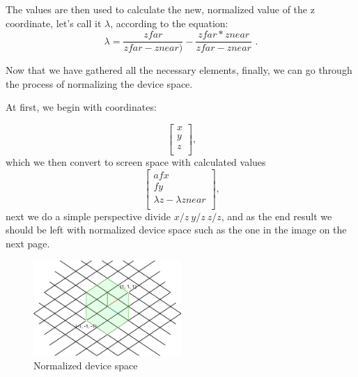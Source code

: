 The values are then used to calculate the new, normalized value of the z coordinate, let's call it $\lambda$, according to the equation:
\begin{equation}
\lambda=\frac{zfar}{zfar - znear)}
-
\frac{zfar * znear}{zfar-znear}
\text{ .}
\label{zequation}
\end{equation} 

Now that we have gathered all the necessary elements, finally, we can go through the process of normalizing the device space.

At first, we begin with coordinates:

\begin{equation}
\begin{bmatrix}
x\\
y\\
z\\
\end{bmatrix}
\text{,}
\label{xyzequation}
\end{equation} 
which we then convert to screen space with calculated values 
\begin{equation}
\begin{bmatrix}
afx\\
fy\\
\lambda z-\lambda znear\\
\end{bmatrix}
\text{,}
\label{zfullxyzequation}
\end{equation} 
next we do a simple perspective divide $x/z\ y/z\ z/z$, and as the end result we should be left with normalized device space such as the one in the image on the next page.


\begin{figure}[H]
  \begin{center}
  \includegraphics[width=0.5\textwidth]{figures/space.png}  
  \end{center}
  \caption{Normalized device space}
\end{figure}

